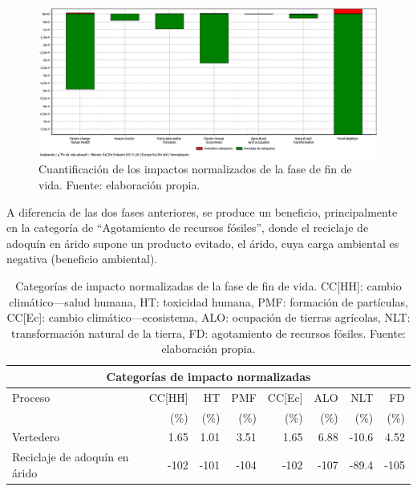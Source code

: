 \begin{figure}[!htb]
\centering
\includegraphics[width=15cm]{img/fdv_normalizacion.png}
\caption[Cuantificación de los impactos normalizados de la fase de fin de vida.]{Cuantificación de los impactos normalizados de la fase de fin de vida. Fuente: elaboración propia.}
\label{fig:fdv_normalizacion}
\end{figure}

A diferencia de las dos fases anteriores, se produce un beneficio, principalmente en la categoría de ``Agotamiento de recursos fósiles'', donde el reciclaje de adoquín en árido supone un producto evitado, el árido, cuya carga ambiental es negativa (beneficio ambiental).

\begin{table}[!htb]
\centering
\begin{tabular}{p{4cm}rrrrrrr}
\toprule
\multicolumn{8}{c}{Categorías de impacto normalizadas}\\
\midrule
Proceso & CC[HH] & HT & PMF & CC[Ec] & ALO & NLT & FD\\
 &  (\%) & (\%) & (\%) & (\%) & (\%) & (\%) & (\%)\\
\midrule
Vertedero & 1.65 & 1.01 & 3.51 & 1.65 & 6.88 & -10.6 & 4.52\\
Reciclaje de adoquín en árido & -102 & -101 & -104 & -102 & -107 & -89.4 & -105\\
\bottomrule
\end{tabular}
\caption[Categorías de impacto normalizadas de la fase de fin de vida.]{Categorías de impacto normalizadas de la fase de fin de vida. CC[HH]: cambio climático—salud humana, HT: toxicidad humana, PMF: formación de partículas, CC[Ec]: cambio climático—ecosistema, ALO: ocupación de tierras agrícolas, NLT: transformación natural de la tierra, FD: agotamiento de recursos fósiles. Fuente: elaboración propia.}
\label{categoriasimpactofdv}
\end{table}

